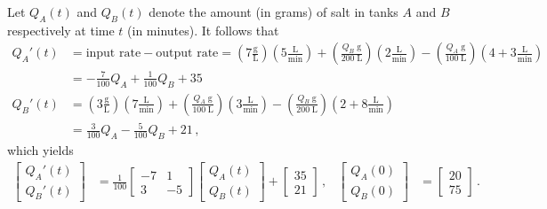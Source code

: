 \begin{enumerate}[1.]
\begin{Solution}
  Let $Q_A(t)$ and $Q_B(t)$ denote the amount (in grams) of salt in tanks $A$
  and $B$ respectively at time $t$ (in minutes).  It follows that
  \begin{align*}
    Q_A'(t) &= \text{input rate} - \text{output rate} = \left( 7
      \frac{\text{g}}{\text{L}} \right) \left( 5 \frac{\text{L}}{\text{min}}
    \right) + \left( \frac{Q_B \; \text{g}}{200 \; \text{L}} \right) \left( 2
      \tfrac{\text{L}}{\text{min}} \right) - \left( \frac{Q_A \; \text{g}}{100
        \; \text{L}} \right) \left( 4 + 3 \frac{\text{L}}{\text{min}} \right) \\
    &= - \frac{7}{100} Q_A + \frac{1}{100} Q_B + 35 \\
    Q_B'(t) &= \left( 3 \frac{\text{g}}{\text{L}} \right) \left( 7
      \frac{\text{L}}{\text{min}} \right) + \left( \frac{Q_A \; \text{g}}{100 \;
        \text{L}} \right) \left( 3 \frac{\text{L}}{\text{min}} \right) - \left(
      \frac{Q_B \; \text{g}}{200 \; \text{L}} \right) \left( 2+8
      \tfrac{\text{L}}{\text{min}} \right) \\
    &=  \frac{3}{100} Q_A - \frac{5}{100} Q_B + 21 \, ,
  \end{align*}
  which yields
  \begin{align*}
    \begin{bmatrix}
      Q_A'(t) \\ Q_B'(t) 
    \end{bmatrix}
    &= 
    \frac{1}{100}
    \begin{bmatrix}
      -7 & 1 \\
      3 & -5
    \end{bmatrix}
    \begin{bmatrix}
      Q_A(t) \\ Q_B(t) 
    \end{bmatrix}
    +
    \begin{bmatrix}
      35 \\ 21
    \end{bmatrix} \, ,
    &
    \begin{bmatrix}
      Q_A(0) \\ Q_B(0) 
    \end{bmatrix}
    &=
    \begin{bmatrix}
      20 \\ 75
    \end{bmatrix} \, .
  \end{align*}
  
\end{Solution}




\end{enumerate}


